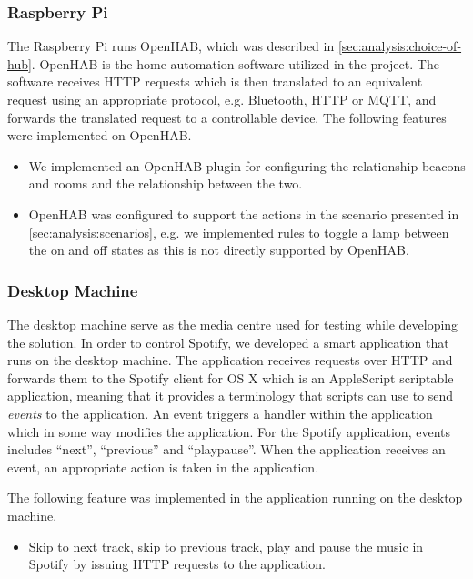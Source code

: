 \subsubsection{Raspberry Pi}

The Raspberry Pi runs OpenHAB, which was described in \cref{sec:analysis:choice-of-hub}. OpenHAB is the home automation software utilized in the project. The software receives HTTP requests which is then translated to an equivalent request using an appropriate protocol, e.g. Bluetooth, HTTP or MQTT, and forwards the translated request to a controllable device. The following features were implemented on OpenHAB.

\begin{itemize}
\item We implemented an OpenHAB plugin for configuring the relationship beacons and rooms and the relationship between the two.
\item OpenHAB was configured to support the actions in the scenario presented in \cref{sec:analysis:scenarios}, e.g. we implemented rules to toggle a lamp between the on and off states as this is not directly supported by OpenHAB.
\end{itemize}

\subsubsection{Desktop Machine}

The desktop machine serve as the media centre used for testing while developing the solution. In order to control Spotify, we developed a smart application that runs on the desktop machine. The application receives requests over HTTP and forwards them to the Spotify client for OS X which is an AppleScript scriptable application, meaning that it provides a terminology that scripts can use to send \emph{events} to the application. An event triggers a handler within the application which in some way modifies the application. For the Spotify application, events includes ``next'', ``previous'' and ``playpause''. When the application receives an event, an appropriate action is taken in the application.

The following feature was implemented in the application running on the desktop machine.

\begin{itemize}
\item Skip to next track, skip to previous track, play and pause the music in Spotify by issuing HTTP requests to the application.
\end{itemize}

